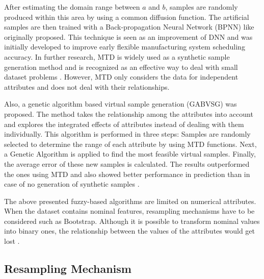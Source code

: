 \documentclass[parskip=full]{scrartcl}
\begin{document}
After estimating the domain range between $\mathit{a}$ and $\mathit{b}$, 
samples are randomly produced within this area by using a common diffusion 
function. The artificial samples are then trained with a Back-propagation 
Neural Network (BPNN) like \cite{Huang.2004} originally proposed. This 
technique is seen as an improvement of DNN and was initially developed to 
improve early flexible manufacturing system scheduling accuracy. In further 
research, MTD is widely used as a synthetic sample generation method and is 
recognized as an effective way to deal with small dataset problems 
\cite{AbdulLateh.2017}. However, MTD only considers the data for independent 
attributes and does not deal with their relationships. 

Also, a genetic algorithm based virtual sample generation (GABVSG) was 
proposed. The method takes the relationship among the attributes into account 
and explores the integrated effects of attributes instead of dealing with them 
individually. This algorithm is performed in three steps: Samples are randomly 
selected to determine the range of each attribute by using MTD functions. Next, 
a Genetic Algorithm is applied to find the most feasible virtual samples. 
Finally, the average error of these new samples is calculated. The results 
outperformed the ones using MTD and also showed better performance in 
prediction than in case of no generation of synthetic samples \cite{Li.2014}.

The above presented fuzzy-based algorithms are limited on numerical attributes. 
When the dataset contains nominal features, resampling mechanisms have to be 
considered such as Bootstrap. Although it is possible to transform nominal 
values into binary ones, the relationship between the values of the attributes 
would get lost \cite{Tsai.2008}. 

\subsection{Resampling Mechanism}
\end{document}
